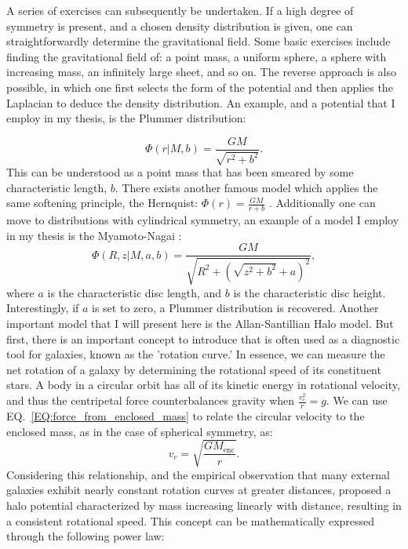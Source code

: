 A series of exercises can subsequently be undertaken. If a high degree of symmetry is present, and a chosen density distribution is given, one can straightforwardly determine the gravitational field. Some basic exercises include finding the gravitational field of: a point mass, a uniform sphere, a sphere with increasing mass, an infinitely large sheet, and so on. The reverse approach is also possible, in which one first selects the form of the potential and then applies the Laplacian to deduce the density distribution. An example, and a potential that I employ in my thesis, is the Plummer distribution:

\begin{equation}
\Phi(r|M,b) = \frac{GM}{\sqrt{r^2 + b^2}}.
\end{equation}
This can be understood as a point mass that has been smeared by some characteristic length, $b$. There exists another famous model which applies the same softening principle, the Hernquist: $\Phi(r) = \frac{GM}{r + b}$ \citep{1990ApJ...356..359H}. Additionally one can move to distributions with cylindrical symmetry, an example of a model I employ in my thesis is the Myamoto-Nagai \citep{1975PASJ...27..533M}: 
\begin{equation}
    \Phi\left(R,z|M,a,b\right) = \frac{GM}{\sqrt{R^2 + \left(\sqrt{z^2 + b^2} + a\right)^2}},
\end{equation}
where $a$ is the characteristic disc length, and $b$ is the characteristic disc height. Interestingly, if $a$ is set to zero, a Plummer distribution is recovered. Another important model that I will present here is the Allan-Santillian Halo model. But first, there is an important concept to introduce that is often used as a diagnostic tool for galaxies, known as the 'rotation curve.' In essence, we can measure the net rotation of a galaxy by determining the rotational speed of its constituent stars. A body in a circular orbit has all of its kinetic energy in rotational velocity, and thus the centripetal force counterbalances gravity when $\frac{v_c^2}{r} = g$. We can use EQ.~\ref{EQ:force_from_enclosed_mass} to relate the circular velocity to the enclosed mass, as in the case of spherical symmetry, as:
\begin{equation}
    v_c = \sqrt{\frac{G M_{\textrm{enc}}}{r}}.
\end{equation}
Considering this relationship, and the empirical observation that many external galaxies exhibit nearly constant rotation curves at greater distances, \citet{1986RMxAA..13..137A} proposed a halo potential characterized by mass increasing linearly with distance, resulting in a consistent rotational speed. This concept can be mathematically expressed through the following power law:
